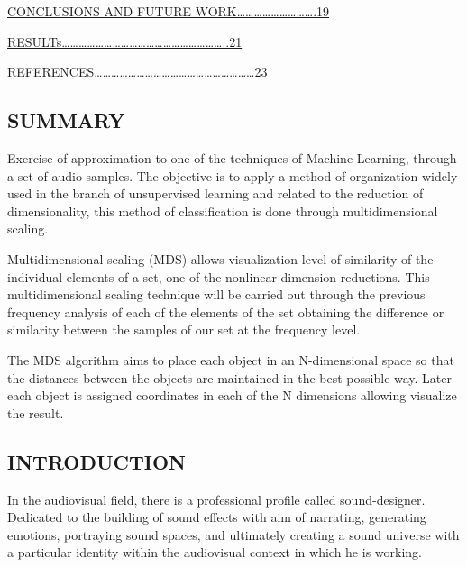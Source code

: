 \documentclass[
]{article}
\begin{document}
\protect\hyperlink{conclusions-and-future-work}{CONCLUSIONS AND FUTURE
WORK\ldots\ldots\ldots\ldots\ldots\ldots\ldots\ldots\ldots.19}
\vspace{12pt}

\protect\hyperlink{results}{RESULTs\ldots\ldots\ldots\ldots\ldots\ldots\ldots\ldots\ldots\ldots\ldots\ldots\ldots\ldots\ldots\ldots\ldots\ldots\ldots..21}
\vspace{12pt}

\protect\hyperlink{references}{REFERENCES\ldots\ldots\ldots\ldots\ldots\ldots\ldots\ldots\ldots\ldots\ldots\ldots\ldots\ldots\ldots\ldots\ldots\ldots\ldots23}

\newpage

\hypertarget{summary}{%
\subsection{SUMMARY}\label{summary}}

\vspace{20pt}

Exercise of approximation to one of the techniques of Machine Learning,
through a set of audio samples. The objective is to apply a method of
organization widely used in the branch of unsupervised learning and
related to the reduction of dimensionality, this method of
classification is done through multidimensional scaling.

Multidimensional scaling (MDS) allows visualization level of similarity
of the individual elements of a set, one of the nonlinear dimension
reductions. This multidimensional scaling technique will be carried out
through the previous frequency analysis of each of the elements of the
set obtaining the difference or similarity between the samples of our
set at the frequency level.

The MDS algorithm aims to place each object in an N-dimensional space so
that the distances between the objects are maintained in the best
possible way. Later each object is assigned coordinates in each of the N
dimensions allowing visualize the result.

\newpage

\hypertarget{introduction}{%
\subsection{INTRODUCTION}\label{introduction}}

\vspace{30pt}

In the audiovisual field, there is a professional profile called
sound-designer. Dedicated to the building of sound effects with aim of
narrating, generating emotions, portraying sound spaces, and ultimately
creating a sound universe with a particular identity within the
audiovisual context in which he is working.
\end{document}
